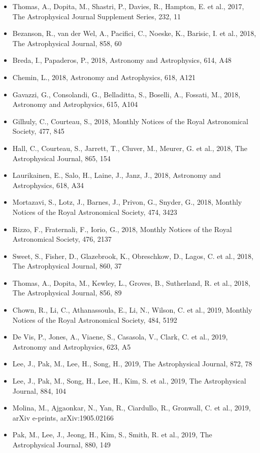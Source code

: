 \documentclass{letter}
\begin{document}
\begin{enumerate}
\begin{itemize}
\item Thomas, A., Dopita, M., Shastri, P., Davies, R., Hampton, E. et al., 2017, The Astrophysical Journal Supplement Series, 232, 11
\item Bezanson, R., van der Wel, A., Pacifici, C., Noeske, K., Barisic, I. et al., 2018, The Astrophysical Journal, 858, 60
\item Breda, I., Papaderos, P., 2018, Astronomy and Astrophysics, 614, A48
\item Chemin, L., 2018, Astronomy and Astrophysics, 618, A121
\item Gavazzi, G., Consolandi, G., Belladitta, S., Boselli, A., Fossati, M., 2018, Astronomy and Astrophysics, 615, A104
\item Gilhuly, C., Courteau, S., 2018, Monthly Notices of the Royal Astronomical Society, 477, 845
\item Hall, C., Courteau, S., Jarrett, T., Cluver, M., Meurer, G. et al., 2018, The Astrophysical Journal, 865, 154
\item Laurikainen, E., Salo, H., Laine, J., Janz, J., 2018, Astronomy and Astrophysics, 618, A34
\item Mortazavi, S., Lotz, J., Barnes, J., Privon, G., Snyder, G., 2018, Monthly Notices of the Royal Astronomical Society, 474, 3423
\item Rizzo, F., Fraternali, F., Iorio, G., 2018, Monthly Notices of the Royal Astronomical Society, 476, 2137
\item Sweet, S., Fisher, D., Glazebrook, K., Obreschkow, D., Lagos, C. et al., 2018, The Astrophysical Journal, 860, 37
\item Thomas, A., Dopita, M., Kewley, L., Groves, B., Sutherland, R. et al., 2018, The Astrophysical Journal, 856, 89
\item Chown, R., Li, C., Athanassoula, E., Li, N., Wilson, C. et al., 2019, Monthly Notices of the Royal Astronomical Society, 484, 5192
\item De Vis, P., Jones, A., Viaene, S., Casasola, V., Clark, C. et al., 2019, Astronomy and Astrophysics, 623, A5
\item Lee, J., Pak, M., Lee, H., Song, H., 2019, The Astrophysical Journal, 872, 78
\item Lee, J., Pak, M., Song, H., Lee, H., Kim, S. et al., 2019, The Astrophysical Journal, 884, 104
\item Molina, M., Ajgaonkar, N., Yan, R., Ciardullo, R., Gronwall, C. et al., 2019, arXiv e-prints, arXiv:1905.02166
\item Pak, M., Lee, J., Jeong, H., Kim, S., Smith, R. et al., 2019, The Astrophysical Journal, 880, 149

\end{itemize}
\end{enumerate}
\end{document}
